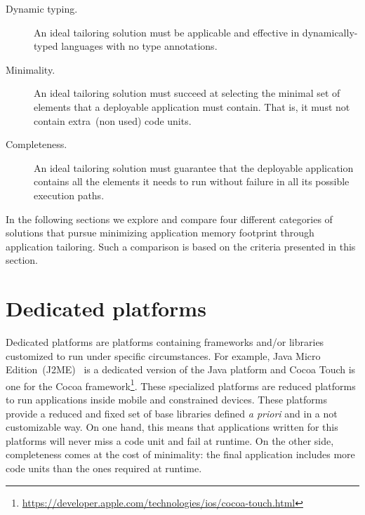 \begin{description}
\item[Dynamic typing.] An ideal tailoring solution must be applicable and effective in dynamically-typed languages \ie with no type annotations.

\item[Minimality.] An ideal tailoring solution must succeed at selecting the minimal set of elements that a deployable application must contain. That is, it must not contain extra~(non used) code units.

\item[Completeness.] An ideal tailoring solution must guarantee that the deployable application contains all the elements it needs to run without failure in all its possible execution paths.

\end{description}

In the following sections we explore and compare four different categories of solutions that pursue minimizing application memory footprint through application tailoring. Such a comparison is based on the criteria presented in this section.


\section{Dedicated platforms}%
\label{section:static_selection_rw}

Dedicated platforms are platforms containing frameworks and/or libraries customized to run under specific circumstances. For example, Java Micro Edition~(J2ME)~\cite{JavaME} is a dedicated version of the Java platform and Cocoa Touch is one for the Cocoa framework\footnote{\url{https://developer.apple.com/technologies/ios/cocoa-touch.html}}. These specialized platforms are reduced platforms to run applications inside mobile and constrained devices. These platforms provide a reduced and fixed set of base libraries defined \emph{a priori} and in a not customizable way. On one hand, this means that applications written for this platforms will never miss a code unit and fail at runtime. On the other side, completeness comes at the cost of minimality: the final application includes more code units than the ones required at runtime.

